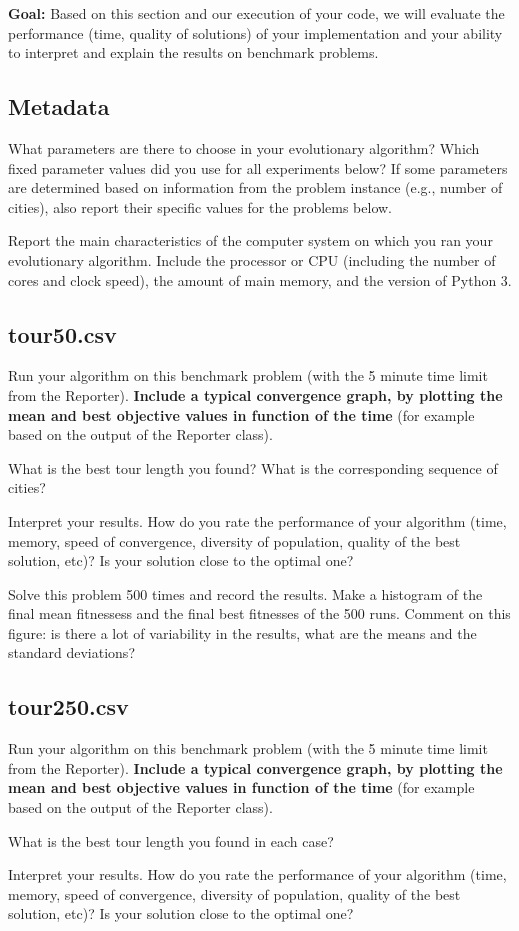 \documentclass[a4paper,10pt]{article}
\newcommand{\ReplaceMe}[1]{{\color{blue}#1}}
\newcommand{\RemoveMe}[1]{{\color{purple}#1}}
\begin{document}
\RemoveMe{\textbf{Goal:} Based on this section and our execution of your code, we will evaluate the performance (time, quality of solutions) of your implementation and your ability to interpret and explain the results on benchmark problems.}

\subsection{Metadata}

\ReplaceMe{What parameters are there to choose in your evolutionary algorithm? Which fixed parameter values did you use for all experiments below? If some parameters are determined based on information from the problem instance (e.g., number of cities), also report their specific values for the problems below.

Report the main characteristics of the computer system on which you ran your evolutionary algorithm. Include the processor or CPU (including the number of cores and clock speed), the amount of main memory, and the version of Python 3.}


\subsection{tour50.csv}

\ReplaceMe{Run your algorithm on this benchmark problem (with the 5 minute time limit from the Reporter). \textbf{Include a typical convergence graph, by plotting the mean and best objective values in function of the time} (for example based on the output of the Reporter class).

What is the best tour length you found? What is the corresponding sequence of cities? 

Interpret your results. How do you rate the performance of your algorithm (time, memory, speed of convergence, diversity of population, quality of the best solution, etc)? Is your solution close to the optimal one?

Solve this problem 500 times and record the results. Make a histogram of the final mean fitnessess and the final best fitnesses of the 500 runs. Comment on this figure: is there a lot of variability in the results, what are the means and the standard deviations?}

\subsection{tour250.csv}\label{sec_shorttour}
\ReplaceMe{Run your algorithm on this benchmark problem (with the 5 minute time limit from the Reporter). \textbf{Include a typical convergence graph, by plotting the mean and best objective values in function of the time} (for example based on the output of the Reporter class).

What is the best tour length you found in each case? 

Interpret your results. How do you rate the performance of your algorithm (time, memory, speed of convergence, diversity of population, quality of the best solution, etc)? Is your solution close to the optimal one?}
\end{document}
